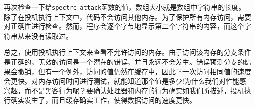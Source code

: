 再次检查一下给\texttt{spectre\_attack}函数的值，数组大小就是数组中字符串的长度。除了在投机执行上下文中，代码不会访问其他内存。为了保护所有内存访问，需要对正确性进行检查。然而，程序会逐个字节地显示第二个字符串的内容，而这个字符串从来没有读取过。

总之，使用投机执行上下文来查看不允许访问的内存。由于访问该内存的分支条件是正确的，无效的访问是一个潜在的错误，并且永远不会发生。错误预测分支的结果会撤销，但有一个例外，访问的值仍然在缓存中，因此下一次访问相同值的速度会更快。对内存访问时间进行测试，就能知道那个值是多少!为什么我们对性能感兴趣，而不是黑客行为呢？要确认处理器和内存的行为确实如我们所描述，投机执行确实发生了，而且缓存确实工作，使得数据访问的速度更快。



















